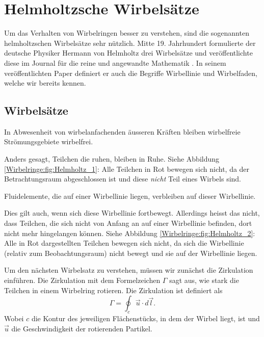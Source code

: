 %
%
%
\section{Helmholtzsche Wirbelsätze}

Um das Verhalten von Wirbelringen besser zu verstehen, sind die sogenannten helmholtzschen Wirbelsätze sehr nützlich. 
Mitte 19. Jahrhundert formulierte der deutsche Physiker Hermann von Helmholtz drei Wirbelsätze und veröffentlichte diese im Journal für die reine und angewandte Mathematik \cite{Wirbelringe:JournalHelmholtz}.
In seinem veröffentlichten Paper definiert er auch die Begriffe Wirbellinie und Wirbelfaden, welche wir bereits kennen.

\subsection{Wirbelsätze}



\begin{satz}
    \label{Wirbelringe:satz:wirbelsatz1}
    In Abwesenheit von wirbelanfachenden äusseren Kräften bleiben wirbelfreie Strömungsgebiete wirbelfrei.
\end{satz}

Anders gesagt, Teilchen die ruhen, bleiben in Ruhe. 
Siehe Abbildung \ref{Wirbelringe:fig:Helmholtz_1}: 
Alle Teilchen in Rot bewegen sich nicht, da der Betrachtungsraum abgeschlossen ist und diese {\em nicht} Teil eines Wirbels sind.

\begin{satz}
    \label{Wirbelringe:satz:wirbelsatz2}
    Fluidelemente, die auf einer Wirbellinie liegen, verbleiben auf dieser Wirbellinie.
\end{satz}

Dies gilt auch, wenn sich diese Wirbellinie fortbewegt.
Allerdings heisst das nicht, dass Teilchen, die sich nicht von Anfang an auf einer Wirbellinie befinden, dort nicht mehr hingelangen können.
Siehe Abbildung \ref{Wirbelringe:fig:Helmholtz_2}:
Alle in Rot dargestellten Teilchen bewegen sich nicht, da sich die Wirbellinie (relativ zum Beobachtungsraum) nicht bewegt und sie auf der Wirbellinie liegen.

Um den nächsten Wirbelsatz zu verstehen, müssen wir zunächst die Zirkulation einführen.
Die Zirkulation mit dem Formelzeichen \(\Gamma\) sagt aus, wie stark die Teilchen in einem Wirbelring rotieren.
Die Zirkulation ist definiert als 
\begin{equation}
    \label{Wirbelringe:eq:Zirkulation}
    \Gamma
    = 
    \oint_{c} \vec{u} \cdot d \vec{l}.
\end{equation}
Wobei \(c\) die Kontur des jeweiligen Flächenstücks, in dem der Wirbel liegt, ist und \(\vec{u}\) die Geschwindigkeit der rotierenden Partikel.

